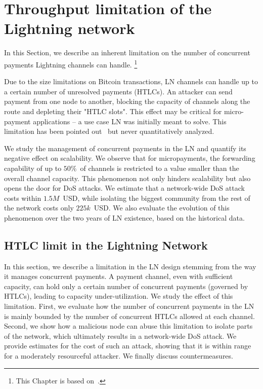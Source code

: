 \chapter{Throughput limitation of the Lightning network}

\label{Chapter08HTLClimit}

In this Section, we describe an inherent limitation on the number of concurrent payments Lightning channels can handle.
\footnote{This Chapter is based on~\cite{Tikhomirov2020a}.}

Due to the size limitations on Bitcoin transactions, LN channels can handle up to a certain number of unresolved payments (HTLCs).
An attacker can send payment from one node to another, blocking the capacity of channels along the route and depleting their "HTLC slots".
This effect may be critical for micro-payment applications -- a use case LN was initially meant to solve.
This limitation has been pointed out~\cite{EmelyanenkoK2017} but never quantitatively analyzed.

We study the management of concurrent payments in the LN and quantify its negative effect on scalability.
We observe that for micropayments, the forwarding capability of up to $50\%$~of channels is restricted to a value smaller than the overall channel capacity.
This phenomenon not only hinders scalability but also opens the door for DoS attacks.
We estimate that a network-wide DoS attack costs within $1.5M$~USD, while isolating the biggest community from the rest of the network costs only $225k$~USD.
We also evaluate the evolution of this phenomenon over the two years of LN existence, based on the historical data.


\section{HTLC limit in the Lightning Network}
\label{sec:attack}

In this section, we describe a limitation in the LN design stemming from the way it manages concurrent payments.
A payment channel, even with sufficient capacity, can hold only a certain number of concurrent payments (governed by HTLCs), leading to capacity under-utilization.
We study the effect of this limitation.
First, we evaluate how the number of concurrent payments in the LN is mainly bounded by the number of concurrent HTLCs allowed at each channel.
Second, we show how a malicious node can abuse this limitation to isolate parts of the network, which ultimately results in a network-wide DoS attack.
We provide estimates for the cost of such an attack, showing that it is within range for a moderately resourceful attacker.
We finally discuss countermeasures.


